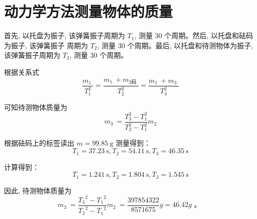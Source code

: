 \documentclass[10pt,a4paper]{article}
\begin{document}
	\section{动力学方法测量物体的质量}

	首先, 以托盘为振子, 该弹簧振子周期为 $T_1$, 测量 30 个周期。然后, 以托盘和砝码为振子, 该弹簧振子 周期为 $T_2$, 测量 30 个周期。最后, 以托盘和待测物体为振子, 该弹簧振子周期为 $T_3$, 测量 30 个周期。

	根据关系式
	$$
	\frac{m_{\text {1 }}}{T_1^2}=\frac{m_{\text {1 }}+m_{\text {2码 }}}{T_2^2}=\frac{m_{\text {1 }}+m_{\text {3 }}}{T_3^2}
	$$

	可知待测物体质量为
	$$
	m_{\text {3 }}=\frac{T_3^2-T_1^2}{T_2^2-T_1^2} m_{\text {2}}
	$$
	
	根据砝码上的标签读出 $m=99.85\mathrm{~g}$ 测量得到：
	$$
	{T_1}=37.23 \mathrm{~s}, {T_2}=54.11 \mathrm{~s}, {T_3}=46.35 \mathrm{~s}
	$$
	
	计算得到：
	$$
	{T_1}=1.241 \mathrm{~s}, {T_2}=1.804 \mathrm{~s}, {T_3}=1.545 \mathrm{~s}
	$$

	因此, 待测物体质量为
	$$
	m_{\text {3 }}=\frac{{{T_3}}^2-{{T_1}}^2}{{{T_2}}^2-{{T_1}}^2} m_{\text {2 }}=\frac{397854322}{8571675} g=46.42 g \text { 。 }
	$$
	
\end{document}
